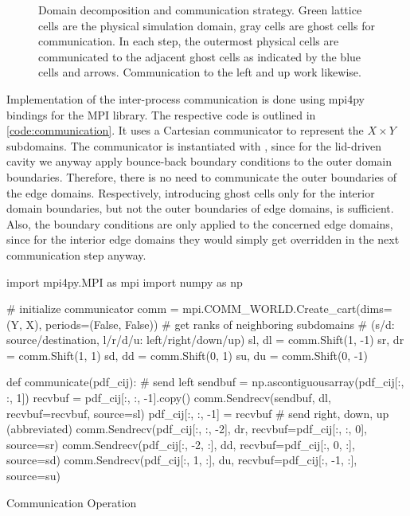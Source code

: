 \begin{figure}[ht!]
    \caption[Domain decomposition and communication strategy]{Domain decomposition and communication strategy. Green lattice cells are the physical simulation domain, gray cells are ghost cells for communication. In each step, the outermost physical cells are communicated to the adjacent ghost cells as indicated by the blue cells and arrows. Communication to the left and up work likewise.}
    \label{fig:domain-decomposition}
\end{figure}

Implementation of the inter-process communication is done using mpi4py bindings for the \gls{MPI} library. The respective code is outlined in \cref{code:communication}. It uses a Cartesian communicator to represent the $X \times Y$ subdomains. The communicator is instantiated with , since for the lid-driven cavity we anyway apply bounce-back boundary conditions to the outer domain boundaries. Therefore, there is no need to communicate the outer boundaries of the edge domains. Respectively, introducing ghost cells only for the interior domain boundaries, but not the outer boundaries of edge domains, is sufficient. Also, the boundary conditions are only applied to the concerned edge domains, since for the interior edge domains they would simply get overridden in the next communication step anyway.

\begin{listing}[ht!]
    \begin{pycode}
        import mpi4py.MPI as mpi
        import numpy as np

        # initialize communicator
        comm = mpi.COMM_WORLD.Create_cart(dims=(Y, X), periods=(False, False))
        # get ranks of neighboring subdomains
        # (s/d: source/destination, l/r/d/u: left/right/down/up)
        sl, dl = comm.Shift(1, -1)
        sr, dr = comm.Shift(1, 1)
        sd, dd = comm.Shift(0, 1)
        su, du = comm.Shift(0, -1)

        def communicate(pdf_cij):
            # send left
            sendbuf = np.ascontiguousarray(pdf_cij[:, :, 1])
            recvbuf = pdf_cij[:, :, -1].copy()
            comm.Sendrecv(sendbuf, dl, recvbuf=recvbuf, source=sl)
            pdf_cij[:, :, -1] = recvbuf
            # send right, down, up (abbreviated)
            comm.Sendrecv(pdf_cij[:, :, -2], dr, recvbuf=pdf_cij[:, :, 0], source=sr)
            comm.Sendrecv(pdf_cij[:, -2, :], dd, recvbuf=pdf_cij[:, 0, :], source=sd)
            comm.Sendrecv(pdf_cij[:, 1, :], du, recvbuf=pdf_cij[:, -1, :], source=su)
    \end{pycode}
    \caption{Communication Operation}
    \label{code:communication}
\end{listing}

